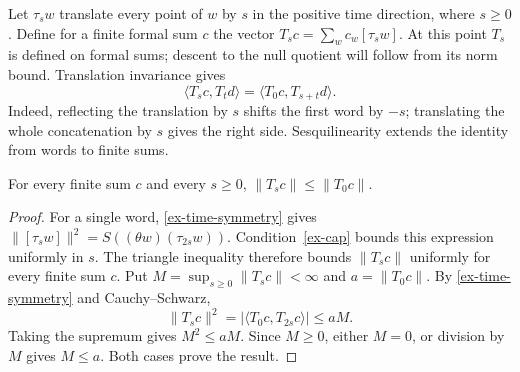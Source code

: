 Let \(\tau_s w\) translate every point of \(w\) by \(s\) in the positive
time direction, where \(s\ge0\). Define for a finite formal sum \(c\)
the vector \(T_s c=\sum_w c_w[\tau_s w]\). At this point \(T_s\) is
defined on formal sums; descent to the null quotient will follow from its
norm bound. Translation invariance gives
\begin{equation}\label{ex-time-symmetry}
 \langle T_s c,T_t d\rangle=\langle T_0c,T_{s+t}d\rangle.
\end{equation}
Indeed, reflecting the translation by \(s\) shifts the first word by
\(-s\); translating the whole concatenation by \(s\) gives the right
side. Sesquilinearity extends the identity from words to finite sums.

\begin{lemma}\label{ex-contraction}
For every finite sum \(c\) and every \(s\ge0\),
\(\|T_sc\|\le\|T_0c\|\).
\end{lemma}
\begin{proof}
For a single word, \eqref{ex-time-symmetry} gives
\(\|[\tau_sw]\|^2=S((\theta w)(\tau_{2s}w))\).
Condition~\eqref{ex-cap} bounds this expression uniformly in \(s\).
The triangle inequality therefore bounds \(\|T_sc\|\) uniformly for
every finite sum \(c\). Put
\(M=\sup_{s\ge0}\|T_sc\|<\infty\) and \(a=\|T_0c\|\).
By \eqref{ex-time-symmetry} and Cauchy--Schwarz,
\[
 \|T_sc\|^2=|\langle T_0c,T_{2s}c\rangle|\le aM.
\]
Taking the supremum gives \(M^2\le aM\). Since \(M\ge0\), either
\(M=0\), or division by \(M\) gives \(M\le a\). Both cases prove
the result.
\end{proof}

